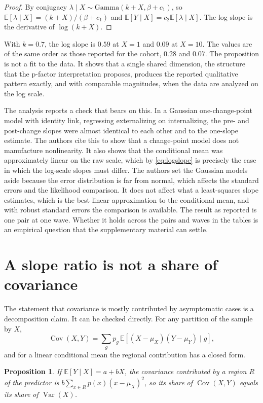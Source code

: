 \documentclass[11pt]{article}
\newtheorem{proposition}{Proposition}
\theoremstyle{definition}
\newcommand{\E}{\mathbb{E}}
\newcommand{\Cov}{\operatorname{Cov}}
\newcommand{\Var}{\operatorname{Var}}
\begin{document}
\begin{proof}
By conjugacy $\lambda\mid X\sim\mathrm{Gamma}(k+X,\beta+c_1)$, so $\E[\lambda\mid X]=(k+X)/(\beta+c_1)$ and $\E[Y\mid X]=c_2\E[\lambda\mid X]$. The log slope is the derivative of $\log(k+X)$.
\end{proof}

With $k=0.7$, the log slope is $0.59$ at $X=1$ and $0.09$ at $X=10$. The values are of the same order as those reported for the cohort, $0.28$ and $0.07$. The proposition is not a fit to the data. It shows that a single shared dimension, the structure that the p-factor interpretation proposes, produces the reported qualitative pattern exactly, and with comparable magnitudes, when the data are analyzed on the log scale.

The analysis reports a check that bears on this. In a Gaussian one-change-point model with identity link, regressing externalizing on internalizing, the pre- and post-change slopes were almost identical to each other and to the one-slope estimate. The authors cite this to show that a change-point model does not manufacture nonlinearity. It also shows that the conditional mean was approximately linear on the raw scale, which by \eqref{eq:logslope} is precisely the case in which the log-scale slopes must differ. The authors set the Gaussian models aside because the error distribution is far from normal, which affects the standard errors and the likelihood comparison. It does not affect what a least-squares slope estimates, which is the best linear approximation to the conditional mean, and with robust standard errors the comparison is available. The result as reported is one pair at one wave. Whether it holds across the pairs and waves in the tables is an empirical question that the supplementary material can settle.

\section{A slope ratio is not a share of covariance}

The statement that covariance is mostly contributed by asymptomatic cases is a decomposition claim. It can be checked directly. For any partition of the sample by $X$,
\begin{equation}
\Cov(X,Y)=\sum_g p_g\,\E[(X-\mu_X)(Y-\mu_Y)\mid g],
\end{equation}
and for a linear conditional mean the regional contribution has a closed form.

\begin{proposition}
If $\E[Y\mid X]=a+bX$, the covariance contributed by a region $R$ of the predictor is $b\sum_{x\in R}p(x)(x-\mu_X)^2$, so its share of $\Cov(X,Y)$ equals its share of $\Var(X)$.
\end{proposition}
\end{document}
